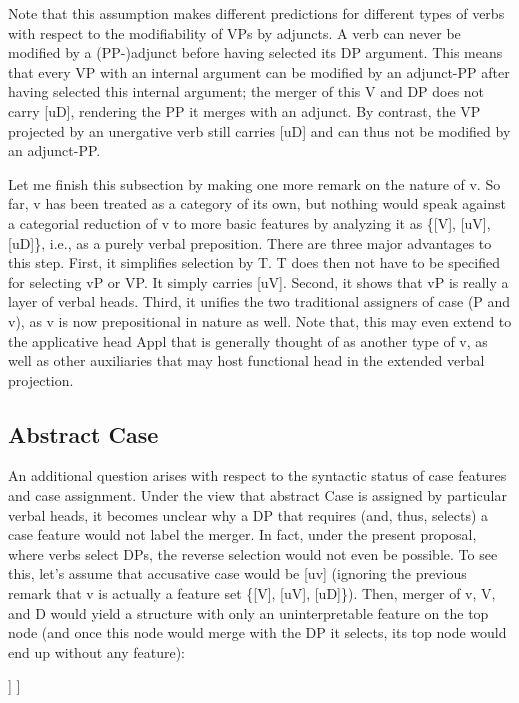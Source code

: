 \documentclass[output=paper
,modfonts
,nonflat]{langsci/langscibook}
\begin{document}
Note that this assumption makes different predictions for different types of verbs with respect to the modifiability of VPs by adjuncts. A verb can never be modified by a (PP-)adjunct before having selected its DP argument. This means that every VP with an internal argument can be modified by an adjunct-PP after having selected this internal argument; the merger of this V and DP does not carry [uD], rendering the PP it merges with an adjunct. By contrast, the VP projected by an unergative verb still carries [uD] and can thus not be modified by an adjunct-PP. 

Let me finish this subsection by making one more remark on the nature of v. So far, v has been treated as a category of its own, but nothing would speak against a categorial reduction of v to more basic features by analyzing it as \{[V], [uV], [uD]\}, i.e., as a purely verbal preposition. There are three major advantages to this step. First, it simplifies selection by T. T does then not have to be specified for selecting vP or VP. It simply carries [uV]. Second, it shows that vP is really a layer of verbal heads. Third, it unifies the two traditional assigners of case (P and v), as v is now prepositional in nature as well. Note that, this may even extend to the applicative head Appl that is generally thought of as another type of v, as well as other auxiliaries that may host functional head in the extended verbal projection.

\subsection{Abstract Case}
An additional question arises with respect to the syntactic status of case features and case assignment. Under the view that abstract Case is assigned by particular verbal heads, it becomes unclear why a DP that requires (and, thus, selects) a case feature would not label the merger. In fact, under the present proposal, where verbs select DPs, the reverse selection would not even be possible. To see this, let’s assume that accusative case would be [uv] (ignoring the previous remark that v is actually a feature set \{[V], [uV], [uD]\}). Then, merger of v, V, and D would yield a structure with only an uninterpretable feature on the top node (and once this node would merge with the DP it selects, its top node would end up without any feature):

	\begin{exe}
    \ex
			\begin{forest}	
				[v'{=}\{{[}uD{]}\}
				[v{=}\{{[}v{]}{,} {[}uV{]}{,} {[}uD{]}\}]
				[VP{=}\{{[}V{]}{,} {[}uv{]}\}
				[V{=}\{{[}V{]}{,} {[}uD{]}\}]
				[DP{=}\{{[}D{]}{,} {[}uv{]}\}]
				] ] 
		\end{forest}
	\end{exe}
\end{document}
